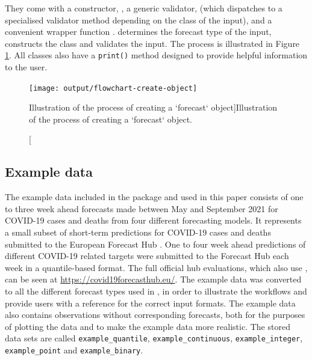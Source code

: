 \documentclass[
]{jss}
\begin{document}
They come with a constructor, , a generic
validator,  (which dispatches to a
specialised validator method depending on the class of the input), and a
convenient wrapper function . 
determines the forecast type of the input, constructs the class and
validates the input. The process is illustrated in Figure
\ref{fig:flowchart-validation}. All classes also have a \texttt{print()}
method designed to provide helpful information to the user.

\begin{CodeChunk}
\begin{figure}[!h]

{\centering \texttt{[image: output/flowchart-create-object]} 

}

\caption[Illustration of the process of creating a `forecast` object]{Illustration of the process of creating a `forecast` object.}\label{fig:flowchart-validation}
\end{figure}
\end{CodeChunk}

\subsection{Example data}\label{example-data}

The example data included in the package and used in this paper consists
of one to three week ahead forecasts made between May and September 2021
for COVID-19 cases and deaths from four different forecasting models. It
represents a small subset of short-term predictions for COVID-19 cases
and deaths submitted to the European Forecast Hub
\citep{europeancovid-19forecasthubEuropeanCovid19Forecast2021}. One to
four week ahead predictions of different COVID-19 related targets were
submitted to the Forecast Hub each week in a quantile-based format. The
full official hub evaluations, which also use , can be
seen at \url{https://covid19forecasthub.eu/}. The example data was
converted to all the different forecast types used in
, in order to illustrate the workflows and provide
users with a reference for the correct input formats. The example data
also contains observations without corresponding forecasts, both for the
purposes of plotting the data and to make the example data more
realistic. The stored data sets are called \texttt{example\_quantile},
\texttt{example\_continuous}, \texttt{example\_integer},
\texttt{example\_point} and \texttt{example\_binary}.
\end{document}
